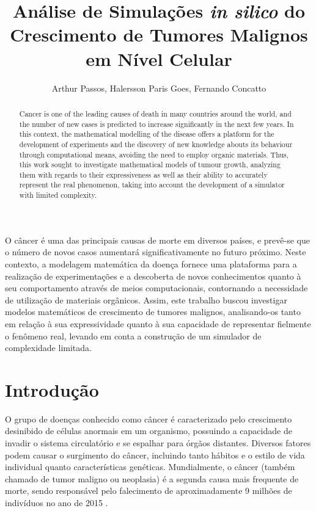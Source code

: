 \documentclass[12pt]{article}
\title{Análise de Simulações \textit{in silico} do Crescimento de Tumores Malignos em Nível Celular}
\author{Arthur Passos\inst{1}, Halersson Paris Goes\inst{1}, Fernando Concatto\inst{1}}
\begin{document}
\maketitle

\begin{abstract}
  Cancer is one of the leading causes of death in many countries around the world, and the number of new cases is predicted to increase significantly in the next few years. In this context, the mathematical modelling of the disease offers a platform for the development of experiments and the discovery of new knowledge abouts its behaviour through computational means, avoiding the need to employ organic materials. Thus, this work sought to investigate mathematical models of tumour growth, analyzing them with regards to their expressiveness as well as their ability to accurately represent the real phenomenon, taking into account the development of a simulator with limited complexity.
\end{abstract}

\begin{resumo}
  O câncer é uma das principais causas de morte em diversos países, e prevê-se que o número de novos casos aumentará significativamente no futuro próximo. Neste contexto, a modelagem matemática da doença fornece uma plataforma para a realização de experimentações e a descoberta de novos conhecimentos quanto à seu comportamento através de meios computacionais, contornando a necessidade de utilização de materiais orgânicos. Assim, este trabalho buscou investigar modelos matemáticos de crescimento de tumores malignos, analisando-os tanto em relação à sua expressividade quanto à sua capacidade de representar fielmente o fenômeno real, levando em conta a construção de um simulador de complexidade limitada. %
\end{resumo}

\section{Introdução}

O grupo de doenças conhecido como câncer é caracterizado pelo crescimento desinibido de células anormais em um organismo, possuindo a capacidade de invadir o sistema circulatório e se espalhar para órgãos distantes. Diversos fatores podem causar o surgimento do câncer, incluindo tanto hábitos e o estilo de vida individual quanto características genéticas. Mundialmente, o câncer (também chamado de tumor maligno ou neoplasia) é a segunda causa mais frequente de morte, sendo responsável pelo falecimento de aproximadamente 9 milhões de indivíduos no ano de 2015 \cite{WHO2017,ACS2017}.
\end{document}
